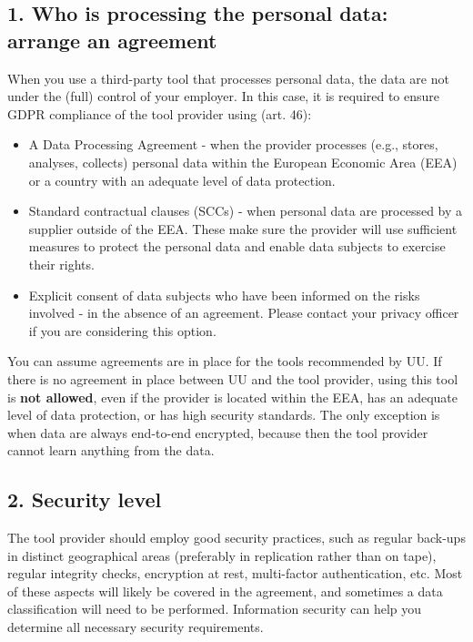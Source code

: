 \documentclass[
]{book}
\providecommand{\tightlist}{%
  \setlength{\itemsep}{0pt}\setlength{\parskip}{0pt}}
\begin{document}
\hypertarget{who-is-processing-the-personal-data-arrange-an-agreement}{%
\subsection{1. Who is processing the personal data: arrange an agreement}\label{who-is-processing-the-personal-data-arrange-an-agreement}}

When you use a third-party tool that processes personal data, the data are not
under the (full) control of your employer. In this case, it is required to
ensure GDPR compliance of the tool provider using
(art. 46):

\begin{itemize}
\tightlist
\item
  A Data Processing Agreement -
  when the provider processes (e.g., stores, analyses, collects) personal data
  within the European Economic Area (EEA) or a country with an
  adequate level of data protection.
\item
  Standard
  contractual clauses (SCCs) - when personal data are processed by a
  supplier outside of the EEA. These make sure the provider will use
  sufficient measures to protect the personal data and enable data subjects to
  exercise their rights.
\item
  Explicit consent of data subjects who have been informed on the risks
  involved - in the absence of an agreement. Please contact your
  privacy officer
  if you are considering this option.
\end{itemize}

You can assume agreements are in place for the tools recommended by UU.
If there is no agreement in place between UU and the tool provider, using
this tool is \textbf{not allowed}, even if the provider is located within the EEA,
has an adequate level of data protection, or has high security standards. The
only exception is when data are always end-to-end encrypted, because then the
tool provider cannot learn anything from the data.

\hypertarget{security-level}{%
\subsection{2. Security level}\label{security-level}}

The tool provider should employ good security practices, such as regular back-ups
in distinct geographical areas (preferably in replication rather than on tape),
regular integrity checks, encryption at rest, multi-factor authentication, etc.
Most of these aspects will likely be covered in the agreement, and sometimes a
data classification will need to be performed.
Information security can help you determine all
necessary security requirements.
\end{document}
